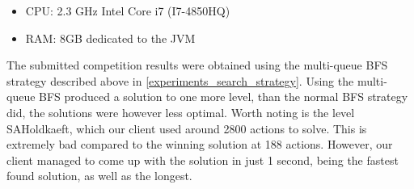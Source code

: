\documentclass[Main]{subfiles}
\begin{document}
\begin{itemize}
\item CPU: 2.3 GHz Intel Core i7 (I7-4850HQ) 
\item RAM: 8GB dedicated to the JVM
\end{itemize}


The submitted competition results were obtained using the multi-queue BFS strategy described above in \autoref{experiments_search_strategy}. Using the multi-queue BFS produced a solution to one more level, than the normal BFS strategy did, the solutions were however less optimal. Worth noting is the level SAHoldkaeft, which our client used around 2800 actions to solve. This is extremely bad compared to the winning solution at 188 actions. However, our client managed to come up with the solution in just 1 second, being the fastest found solution, as well as the longest. 
\end{document}
